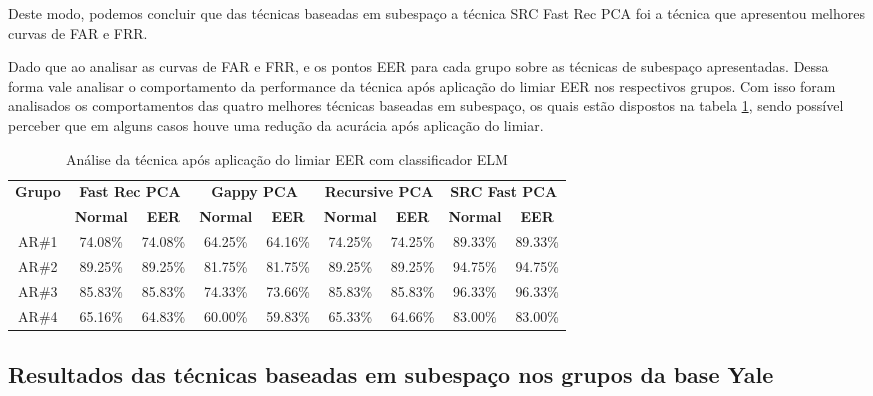 Deste modo, podemos concluir que das técnicas baseadas em subespaço a técnica SRC Fast Rec PCA foi a técnica que apresentou melhores curvas de FAR e FRR.

Dado que ao analisar as curvas de FAR e FRR, e os pontos EER para cada grupo sobre as técnicas de subespaço apresentadas. Dessa forma vale analisar o comportamento da performance da técnica após aplicação do limiar EER nos respectivos grupos. Com isso foram analisados os comportamentos das quatro melhores técnicas baseadas em subespaço, os quais estão dispostos na tabela \ref{tab:eer_subespaco}, sendo possível perceber que em alguns casos houve uma redução da acurácia após aplicação do limiar.



\begin{table}[htpb]
    \centering
    \footnotesize
	\caption{Análise da técnica após aplicação do limiar EER com classificador ELM}
\begin{tabular}{|c|c|c|c|c|c|c|c|c|}
\hline
\multirow{2}{*}{\textbf{Grupo}}  & \multicolumn{2}{c|}{\textbf{Fast Rec PCA}} & \multicolumn{2}{c|}{\textbf{Gappy PCA}}  & \multicolumn{2}{c|}{\textbf{Recursive PCA}}  & \multicolumn{2}{c|}{\textbf{SRC Fast PCA}}  \\\cline{2-9}
 & \textbf{Normal} & \textbf{EER}& \textbf{Normal} & \textbf{EER} & \textbf{Normal} & \textbf{EER} & \textbf{Normal} & \textbf{EER} \\\hline

AR\#1 &	74.08\%	& 74.08\%	&64.25\%	& 64.16\%	&74.25\%	&74.25\% & 89.33\%	&89.33\% \\\hline
AR\#2 &	89.25\%	& 89.25\%	&81.75\%	& 81.75\%	&89.25\%	&89.25\% & 94.75\%	&94.75\% \\\hline
AR\#3 &	85.83\%	& 85.83\%	&74.33\%	& 73.66\%	&85.83\%	&85.83\% & 96.33\%	&96.33\% \\\hline
AR\#4 &	65.16\%	& 64.83\%	&60.00\%	& 59.83\%	&65.33\%	&64.66\% & 83.00\%	&83.00\% \\\hline
 \end{tabular}
\label{tab:eer_subespaco}
\end{table}







\subsection{Resultados das técnicas baseadas em subespaço nos grupos da base Yale}

